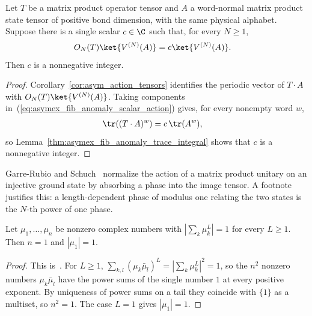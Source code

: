 \begin{lemma}%
    \label{thm:asymex_fib_anomaly_integral_action}
    \leanok
    Let $T$ be a matrix product operator tensor and $A$ a word-normal
    matrix product state tensor of positive bond dimension, with the
    same physical alphabet. Suppose there is a single scalar $c\in\C$
    such that, for every $N\geq1$,
    \begin{align}
        O_N(T)\ket{V^{(N)}(A)}
         & =c\ket{V^{(N)}(A)}.
        \label{eq:asymex_fib_anomaly_scalar_action}
    \end{align}
    Then $c$ is a nonnegative integer.
\end{lemma}

\begin{proof}
    \leanok
    Corollary~\ref{cor:asym_action_tensors} identifies the periodic
    vector of $T\cdot A$ with $O_N(T)\ket{V^{(N)}(A)}$.
    Taking components in~(\ref{eq:asymex_fib_anomaly_scalar_action}) gives,
    for every nonempty word $w$,
    \begin{align}
        \tr((T\cdot A)^w) & =c\,\tr(A^w),
        \notag
    \end{align}
    so Lemma~\ref{thm:asymex_fib_anomaly_trace_integral} shows that $c$ is
    a nonnegative integer.
\end{proof}

Garre-Rubio and Schuch~\cite[Section~II.B]{GarreRubioSchuch2024DomainWall}
normalize the action of a matrix product unitary on an injective ground
state by absorbing a phase into the image tensor. A footnote justifies this:
a length-dependent phase of modulus one relating the two states is the
$N$-th power of one phase.

\begin{lemma}%
    \label{thm:mpoalg_unimodular_power_sum}
    \leanok
    Let $\mu_1,\ldots,\mu_n$ be nonzero complex numbers with
    $\left|\sum_k\mu_k^L\right|=1$ for every $L\geq1$. Then $n=1$ and
    $|\mu_1|=1$.
\end{lemma}

\begin{proof}
    \leanok
    This is~\cite[``Power sums of modulus one'']{QICLean2026Blueprint}.
    For $L\geq1$,
    $\sum_{k,l}(\mu_k\bar\mu_l)^L=\left|\sum_k\mu_k^L\right|^2=1$, so the
    $n^2$ nonzero numbers $\mu_k\bar\mu_l$ have the power sums of the single
    number $1$ at every positive exponent. By uniqueness of power sums on a
    tail they coincide with $\{1\}$ as a multiset, so $n^2=1$. The case $L=1$
    gives $|\mu_1|=1$.
\end{proof}

